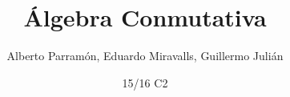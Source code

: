 \documentclass[palatino]{apuntes}
\title{Álgebra Conmutativa}
\author{Alberto Parramón, Eduardo Miravalls, Guillermo Julián}
\date{15/16 C2}
\begin{document}
\pagestyle{plain}
\maketitle

\renewcommand{\chaptername}{Tema}

\renewcommand\thechapter{\arabic{chapter}}

\newcommand{\field}{\ensuremath{\mathbb{F}}}
\newcommand{\K}{\ensuremath{\mathbb{K}}}
\renewcommand\tq{:}
\renewcommand{\U}{\ensuremath{\mathcal{U}}}
\newcommand{\zero}{\ensuremath{\mathbb{0}}}
\newcommand{\one}{\ensuremath{\mathbb{1}}}
\newcommand{\cls}{\gor} %

\renewcommand{\gen}[1]{\mathopen{\langle} #1 \mathclose{\rangle}} %

\newcommand{\st}{ tal que }
\newcommand{\wrt}{ con respecto de }
\newcommand{\ie}{, es decir, }

\tableofcontents
\newpage




\appendix




\nocite{reidAG,reidCA}
{}

\printindex
\end{document}
